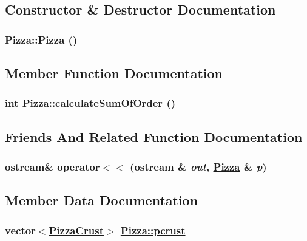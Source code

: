 \subsection{Constructor \& Destructor Documentation}
\hypertarget{class_pizza_700ffe7c4bc34e2c456faa65be04ce6b}{
\subsubsection[Pizza]{\setlength{\rightskip}{0pt plus 5cm}Pizza::Pizza ()}}
\label{class_pizza_700ffe7c4bc34e2c456faa65be04ce6b}




\subsection{Member Function Documentation}
\hypertarget{class_pizza_24b9bb5302a251b41fed3df1fb7ce8ad}{
\subsubsection[calculateSumOfOrder]{\setlength{\rightskip}{0pt plus 5cm}int Pizza::calculate\-Sum\-Of\-Order ()}}
\label{class_pizza_24b9bb5302a251b41fed3df1fb7ce8ad}




\subsection{Friends And Related Function Documentation}
\hypertarget{class_pizza_6234ace0cc7b9a861bdeecd0223d6b69}{
\subsubsection[operator$<$$<$]{\setlength{\rightskip}{0pt plus 5cm}ostream\& operator$<$$<$ (ostream \& {\em out}, \hyperlink{class_pizza}{Pizza} \& {\em p})}}
\label{class_pizza_6234ace0cc7b9a861bdeecd0223d6b69}




\subsection{Member Data Documentation}
\hypertarget{class_pizza_996e08e9df9ac8ddc88bd05cd6e02761}{
\subsubsection[pcrust]{\setlength{\rightskip}{0pt plus 5cm}vector$<$\hyperlink{class_pizza_crust}{Pizza\-Crust}$>$ \hyperlink{class_pizza_996e08e9df9ac8ddc88bd05cd6e02761}{Pizza::pcrust}}}
\label{class_pizza_996e08e9df9ac8ddc88bd05cd6e02761}


